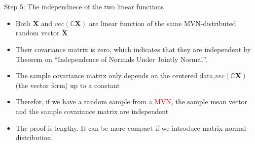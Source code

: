 \documentclass[
  ignorenonframetext,
]{beamer}
\providecommand{\tightlist}{%
  \setlength{\itemsep}{0pt}\setlength{\parskip}{0pt}}
\begin{document}
\begin{frame}{Step 5: The independnece of the two linear functions}
\protect\hypertarget{step-5-the-independnece-of-the-two-linear-functions}{}
\begin{itemize}
\tightlist
\item
  Both \(\bar{\mathbf X}\) and \(vec(\mathbb C\mathbf X)\) are linear
  function of the same MVN-distributed random vector
  \(\tilde {\mathbf X}\)
\item
  Their covariance matrix is zero, which indicates that they are
  independent by Theorem on ``Independence of Normals Under Jointly
  Normal''.
\item
  The sample covariance matrix only depends on the centered
  data,\(vec(\mathbb C\mathbf X)\) (the vector form) up to a constant
\item
  Therefor, if we have a random sample from a \textcolor{red}{MVN}, the
  sample mean vector and the sample covariance matrix are independent
\item
  The proof is lengthy. It can be more compact if we introduce matrix
  normal distribution.
\end{itemize}
\end{frame}
\end{document}
